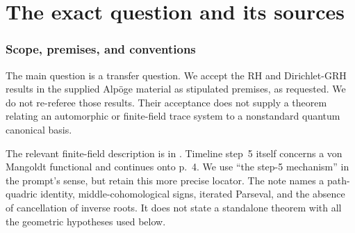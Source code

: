 \documentclass[11pt,a4paper]{article}
\theoremstyle{named}\newtheorem{finding}{Finding}[section]
\theoremstyle{definition}\newtheorem{definition}[finding]{Definition}
\theoremstyle{remark}\newtheorem{remark}[finding]{Remark}
\begin{document}
\begin{abstract}
Ordinary and motivic Satake supply pure Tate classical multiplicity objects without selecting the designated nonstandard basis. Primitive Grassmannian motives and compressed witnesses give two-row rectangular results. A known Kahle--Micha{\l}ek theorem refutes the attached homogeneous Ehrhart PH1; separate encoding obstructions delimit replacement complexity claims. Every checked finding has its full proof and a separate Grothendieck-framework translation with exact source and archival locators. Independently bounded local coefficient systems, designated arithmetic and basis comparisons, and strict orbit-closure multiplicity inequalities remain open.
\end{abstract}
\begin{center}
\end{center}
\newpage\setcounter{tocdepth}{1}{\small\tableofcontents}\newpage

\part{The exact question and its sources}
\section{Scope, premises, and conventions}\label{sec:scope}
The main question is a transfer question. We accept the RH and Dirichlet-GRH results in the supplied Alp\"oge material as stipulated premises, as requested. We do not re-referee those results. Their acceptance does not supply a theorem relating an automorphic or finite-field trace system to a nonstandard quantum canonical basis.

The relevant finite-field description is in \cite[printed p.~3, footnote~3, attached to the paragraph before the timeline; also step~3]{Alpoge}. Timeline step~5 itself concerns a von Mangoldt functional and continues onto p.~4. We use ``the step-5 mechanism'' in the prompt's sense, but retain this more precise locator. The note names a path-quadric identity, middle-cohomological signs, iterated Parseval, and the absence of cancellation of inverse roots. It does not state a standalone theorem with all the geometric hypotheses used below.
\end{document}
